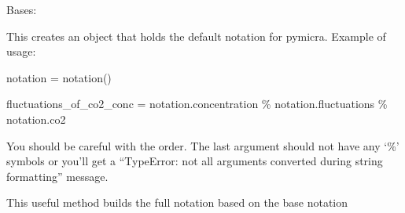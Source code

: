 \documentclass[a4paper,10pt,oneside]{sphinxmanual}
\begin{document}
\begin{fulllineitems}
\label{pymicra:pymicra.core.Notation}
Bases: 

This creates an object that holds the default notation for pymicra.
Example of usage:

notation = notation()

fluctuations\_of\_co2\_conc = notation.concentration \% notation.fluctuations \% notation.co2

You should be careful with the order. The last argument should not have any `\%' symbols
or you'll get a ``TypeError: not all arguments converted during string formatting'' message.

\begin{fulllineitems}
\label{pymicra:pymicra.core.Notation.build}
This useful method builds the full notation based on the base notation

\end{fulllineitems}


\begin{fulllineitems}
\label{pymicra:pymicra.core.Notation.concentration}
\end{fulllineitems}


\begin{fulllineitems}
\label{pymicra:pymicra.core.Notation.cospectrum}
\end{fulllineitems}


\begin{fulllineitems}
\label{pymicra:pymicra.core.Notation.cross_spectrum}
\end{fulllineitems}


\begin{fulllineitems}
\label{pymicra:pymicra.core.Notation.density}
\end{fulllineitems}


\end{fulllineitems}
\end{document}
